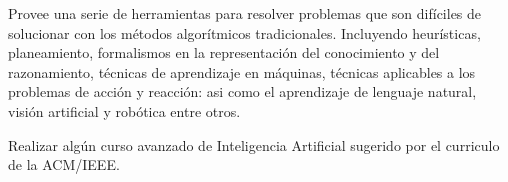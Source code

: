 \begin{syllabus}


\begin{justification}
Provee una serie de herramientas para resolver problemas que son difíciles de solucionar con los métodos algorítmicos tradicionales. Incluyendo heurísticas, planeamiento, formalismos en la representación del conocimiento y del razonamiento, técnicas de aprendizaje en máquinas, técnicas aplicables a los problemas de acción y reacción: asi como el aprendizaje de lenguaje natural, visión artificial y robótica entre otros. 
\end{justification}

\begin{goals}
\item Realizar algún curso avanzado de Inteligencia Artificial sugerido por el curriculo de la ACM/IEEE.
\end{goals}

\begin{outcomes}
\item {}
\item {}
\item {}
\item {}
\end{outcomes}

\begin{competences}
\item {} 
\item {} 
\item {}
\end{competences}


\end{syllabus}
